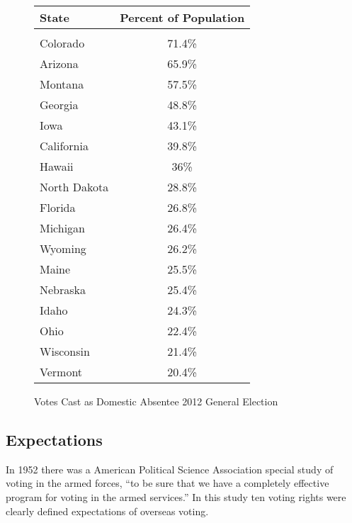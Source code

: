 \begin{figure}
\begin{center}
\begin{tabular}{l c}
{\bf State} & {\bf Percent of Population}\\\hline\\
Colorado & 71.4\%\\
Arizona & 65.9\%\\
Montana & 57.5\%\\
Georgia & 48.8\%\\
Iowa & 43.1\%\\
California & 39.8\%\\
Hawaii & 36\%\\
North Dakota & 28.8\%\\
Florida & 26.8\%\\
Michigan & 26.4\%\\
Wyoming & 26.2\%\\
Maine & 25.5\%\\
Nebraska & 25.4\%\\
Idaho & 24.3\%\\
Ohio & 22.4\%\\
Wisconsin & 21.4\%\\
Vermont & 20.4\%\\
\end{tabular}
\end{center}
\caption{Votes Cast as Domestic Absentee 2012 General Election}
\label{fig:domestic_populations}
\end{figure}

\subsection{Expectations}

In 1952 there was a American Political Science Association special study of voting in the armed forces, ``to be sure that we have a completely effective program for voting in the armed services.'' In this study ten voting rights were clearly defined expectations of overseas voting.

